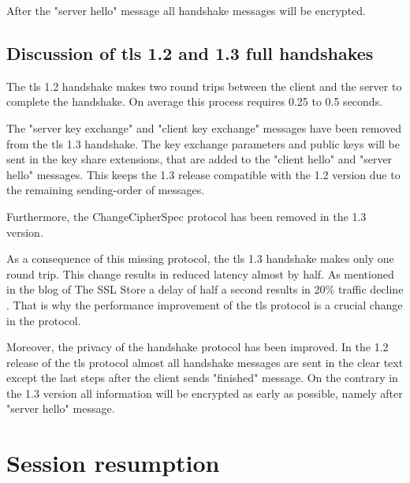After the "server hello" message all handshake messages will be encrypted.
\cite{recorla}
\subsection{Discussion of \gls{tls} 1.2 and 1.3 full handshakes}
\label{subsec:comparison_handshake}

The \gls{tls} 1.2 handshake makes two round trips between the client and the server to complete the handshake. On average this process requires 0.25 to 0.5 seconds.

The "server key exchange" and "client key exchange" messages have been removed from the \gls{tls} 1.3 handshake. The key exchange parameters and public keys will be sent in the key share extensions, that are added to the "client hello" and "server hello" messages. This keeps the 1.3 release compatible with the 1.2 version due to the remaining sending-order of messages.

Furthermore, the ChangeCipherSpec protocol has been removed in the 1.3 version. 

As a consequence of this missing protocol, the \gls{tls} 1.3 handshake makes only one round trip. This change results in reduced latency almost by half. As mentioned in the blog of The SSL Store a delay of half a second results in 20\% traffic decline \cite{sslstore:handshake}. That is why the performance improvement of the \gls{tls} protocol is a crucial change in the protocol.

Moreover, the privacy of the handshake protocol has been improved. In the 1.2 release of the \gls{tls} protocol almost all handshake messages are sent in the clear text except the last steps after the client sends "finished" message. On the contrary in the 1.3 version all information will be encrypted as early as possible, namely after "server hello" message. 

\section{Session resumption}
\label{sec:comparison_resumption}

